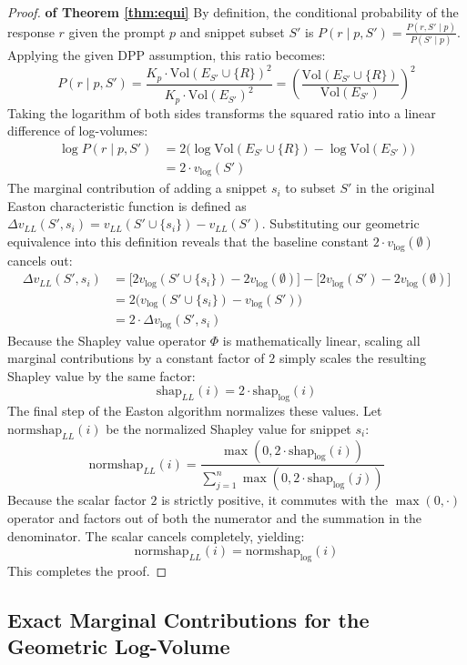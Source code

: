 \documentclass{article}
\newenvironment{proofof}[1]{\begin{proof}\textbf{of {#1}}}{\end{proof}}
\begin{document}
\begin{proofof}{Theorem \ref{thm:equi}}
By definition, the conditional probability of the response $r$ given the prompt $p$ and snippet subset $S'$ is $P(r \mid p, S') = \frac{P(r, S' \mid p)}{P(S' \mid p)}$. Applying the given DPP assumption, this ratio becomes:
$$ P(r \mid p, S') = \frac{K_p \cdot \text{Vol}(E_{S'} \cup \{R\})^2}{K_p \cdot \text{Vol}(E_{S'})^2} = \left( \frac{\text{Vol}(E_{S'} \cup \{R\})}{\text{Vol}(E_{S'})} \right)^2 $$
Taking the logarithm of both sides transforms the squared ratio into a linear difference of log-volumes:
\begin{align*}
\log P(r \mid p, S') &= 2 \Big( \log \text{Vol}(E_{S'} \cup \{R\}) - \log \text{Vol}(E_{S'}) \Big) \\
&= 2 \cdot v_{\log}(S')
\end{align*}
The marginal contribution of adding a snippet $s_i$ to subset $S'$ in the original Easton characteristic function is defined as $\Delta v_{LL}(S', s_i) = v_{LL}(S' \cup \{s_i\}) - v_{LL}(S')$. Substituting our geometric equivalence into this definition reveals that the baseline constant $2 \cdot v_{\log}(\emptyset)$ cancels out:
\begin{align*}
\Delta v_{LL}(S', s_i) &= \Big[ 2 v_{\log}(S' \cup \{s_i\}) - 2 v_{\log}(\emptyset) \Big] - \Big[ 2 v_{\log}(S') - 2 v_{\log}(\emptyset) \Big] \\
&= 2 \Big( v_{\log}(S' \cup \{s_i\}) - v_{\log}(S') \Big) \\
&= 2 \cdot \Delta v_{\log}(S', s_i)
\end{align*}
Because the Shapley value operator $\Phi$ is mathematically linear, scaling all marginal contributions by a constant factor of $2$ simply scales the resulting Shapley value by the same factor:
$$ \text{shap}_{LL}(i) = 2 \cdot \text{shap}_{\log}(i) $$
The final step of the Easton algorithm normalizes these values. Let $\text{normshap}_{LL}(i)$ be the normalized Shapley value for snippet $s_i$:
$$ \text{normshap}_{LL}(i) = \frac{\max(0, 2 \cdot \text{shap}_{\log}(i))}{\sum_{j=1}^n \max(0, 2 \cdot \text{shap}_{\log}(j))} $$
Because the scalar factor $2$ is strictly positive, it commutes with the $\max(0, \cdot)$ operator and factors out of both the numerator and the summation in the denominator. The scalar cancels completely, yielding:
$$ \text{normshap}_{LL}(i) = \text{normshap}_{\log}(i) $$
This completes the proof.
\end{proofof}

\subsection{Exact Marginal Contributions for the Geometric Log-Volume}
\end{document}
